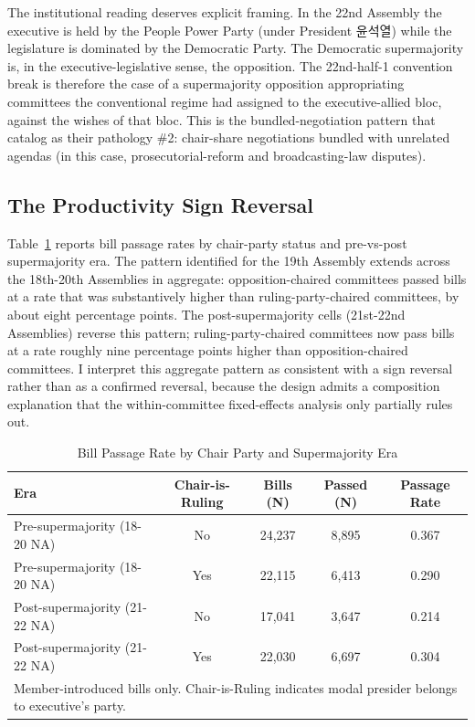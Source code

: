 \documentclass[11pt]{article}
\begin{document}
The institutional reading deserves explicit framing. In the 22nd Assembly the executive is held by the People Power Party (under President 윤석열) while the legislature is dominated by the Democratic Party. The Democratic supermajority is, in the executive-legislative sense, the opposition. The 22nd-half-1 convention break is therefore the case of a supermajority opposition appropriating committees the conventional regime had assigned to the executive-allied bloc, against the wishes of that bloc. This is the bundled-negotiation pattern that \citet{leekim2022} catalog as their pathology \#2: chair-share negotiations bundled with unrelated agendas (in this case, prosecutorial-reform and broadcasting-law disputes).

\subsection{The Productivity Sign Reversal}

Table~\ref{tab:productivity} reports bill passage rates by chair-party status and pre-vs-post supermajority era. The pattern \citet{yunan2018} identified for the 19th Assembly extends across the 18th-20th Assemblies in aggregate: opposition-chaired committees passed bills at a rate that was substantively higher than ruling-party-chaired committees, by about eight percentage points. The post-supermajority cells (21st-22nd Assemblies) reverse this pattern; ruling-party-chaired committees now pass bills at a rate roughly nine percentage points higher than opposition-chaired committees. I interpret this aggregate pattern as consistent with a sign reversal rather than as a confirmed reversal, because the design admits a composition explanation that the within-committee fixed-effects analysis only partially rules out.

\begin{table}[ht]
\centering
\caption{Bill Passage Rate by Chair Party and Supermajority Era}
\label{tab:productivity}
\begin{tabular}{lcccc}
\toprule
Era & Chair-is-Ruling & Bills (N) & Passed (N) & Passage Rate \\
\midrule
Pre-supermajority (18-20 NA) & No & 24,237 & 8,895 & 0.367 \\
Pre-supermajority (18-20 NA) & Yes & 22,115 & 6,413 & 0.290 \\
Post-supermajority (21-22 NA) & No & 17,041 & 3,647 & 0.214 \\
Post-supermajority (21-22 NA) & Yes & 22,030 & 6,697 & 0.304 \\
\bottomrule
\multicolumn{5}{l}{\footnotesize Member-introduced bills only. Chair-is-Ruling indicates modal presider belongs to executive's party.} \\
\end{tabular}
\end{table}
\end{document}
